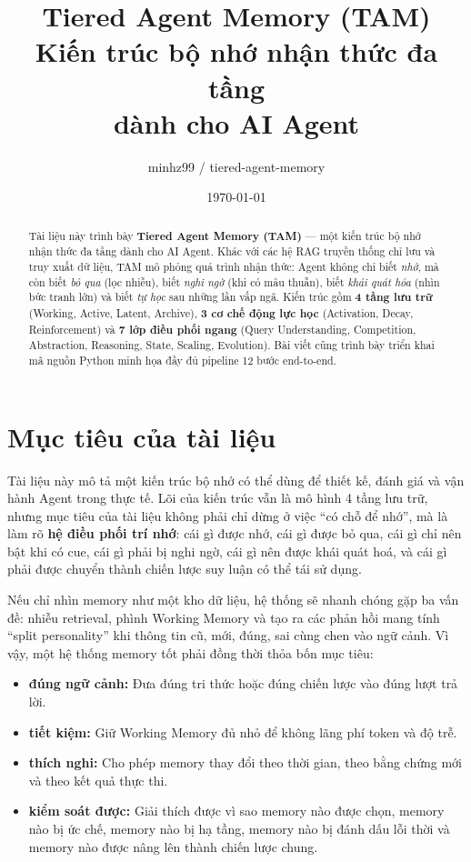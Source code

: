 \documentclass[a4paper,12pt]{article}
\title{\textbf{Tiered Agent Memory (TAM)}\\[6pt]
  \large Kiến trúc bộ nhớ nhận thức đa tầng\\dành cho AI Agent}
\author{minhz99 / tiered-agent-memory}
\date{\today}
\begin{document}
\maketitle

\begin{abstract}
Tài liệu này trình bày \textbf{Tiered Agent Memory (TAM)} --- một kiến trúc bộ nhớ nhận thức đa tầng dành cho AI Agent. Khác với các hệ RAG truyền thống chỉ lưu và truy xuất dữ liệu, TAM mô phỏng quá trình nhận thức: Agent không chỉ biết \emph{nhớ}, mà còn biết \emph{bỏ qua} (lọc nhiễu), biết \emph{nghi ngờ} (khi có mâu thuẫn), biết \emph{khái quát hóa} (nhìn bức tranh lớn) và biết \emph{tự học} sau những lần vấp ngã. Kiến trúc gồm \textbf{4 tầng lưu trữ} (Working, Active, Latent, Archive), \textbf{3 cơ chế động lực học} (Activation, Decay, Reinforcement) và \textbf{7 lớp điều phối ngang} (Query Understanding, Competition, Abstraction, Reasoning, State, Scaling, Evolution). Bài viết cũng trình bày triển khai mã nguồn Python minh họa đầy đủ pipeline 12 bước end-to-end.
\end{abstract}

\tableofcontents
\newpage

\section{Mục tiêu của tài liệu}

Tài liệu này mô tả một kiến trúc bộ nhớ có thể dùng để thiết kế, đánh giá và vận hành Agent trong thực tế. Lõi của kiến trúc vẫn là mô hình 4 tầng lưu trữ, nhưng mục tiêu của tài liệu không phải chỉ dừng ở việc ``có chỗ để nhớ'', mà là làm rõ \textbf{hệ điều phối trí nhớ}: cái gì được nhớ, cái gì được bỏ qua, cái gì chỉ nên bật khi có cue, cái gì phải bị nghi ngờ, cái gì nên được khái quát hoá, và cái gì phải được chuyển thành chiến lược suy luận có thể tái sử dụng.

Nếu chỉ nhìn memory như một kho dữ liệu, hệ thống sẽ nhanh chóng gặp ba vấn đề: nhiễu retrieval, phình Working Memory và tạo ra các phản hồi mang tính ``split personality'' khi thông tin cũ, mới, đúng, sai cùng chen vào ngữ cảnh. Vì vậy, một hệ thống memory tốt phải đồng thời thỏa bốn mục tiêu:
\begin{itemize}
    \item \textbf{đúng ngữ cảnh:} Đưa đúng tri thức hoặc đúng chiến lược vào đúng lượt trả lời.
    \item \textbf{tiết kiệm:} Giữ Working Memory đủ nhỏ để không lãng phí token và độ trễ.
    \item \textbf{thích nghi:} Cho phép memory thay đổi theo thời gian, theo bằng chứng mới và theo kết quả thực thi.
    \item \textbf{kiểm soát được:} Giải thích được vì sao memory nào được chọn, memory nào bị ức chế, memory nào bị hạ tầng, memory nào bị đánh dấu lỗi thời và memory nào được nâng lên thành chiến lược chung.
\end{itemize}
\end{document}
